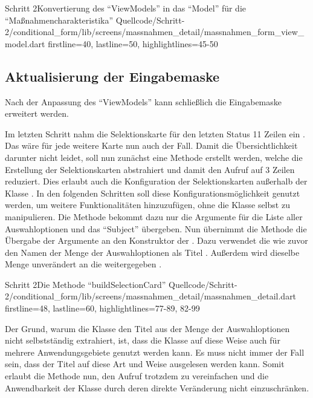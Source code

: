 \begin{alexlisting}{Schritt 2}{Konvertierung des \enquote{ViewModels} in das \enquote{Model} für die \enquote{Maßnahmencharakteristika}}
  {Quellcode/Schritt-2/conditional_form/lib/screens/massnahmen_detail/massnahmen_form_view_model.dart}
  {firstline=40, lastline=50, highlightlines={45-50}}
  \label{lst:Schritt2KonvertierungDesViewModelsInDasModel}
\end{alexlisting}

\subsection{Aktualisierung der Eingabemaske}

Nach der Anpassung des \enquote{ViewModels} kann schließlich die Eingabemaske erweitert werden.

Im letzten Schritt nahm die Selektionskarte für den letzten Status 11 Zeilen ein . 
Das wäre für jede weitere Karte nun auch der Fall.
Damit die Übersichtlichkeit darunter nicht leidet, soll nun zunächst eine Methode erstellt werden, welche die Erstellung der Selektionskarten abstrahiert und damit den Aufruf auf 3 Zeilen reduziert.
Dies erlaubt auch die Konfiguration der Selektionskarten außerhalb der Klasse .
In den folgenden Schritten soll diese Konfigurationsmöglichkeit genutzt werden, um weitere Funktionalitäten hinzuzufügen, ohne die Klasse selbst zu manipulieren.
Die Methode  bekommt dazu nur die Argumente für die Liste aller Auswahloptionen   und das \enquote{Subject}   übergeben.
Nun übernimmt die Methode die Übergabe der Argumente an den Konstruktor der .
Dazu verwendet die  wie zuvor den Namen der Menge der Auswahloptionen als Titel .
Außerdem wird dieselbe Menge unverändert an die  weitergegeben .

\begin{alexlisting}{Schritt 2}{Die Methode \enquote{buildSelectionCard}}
  {Quellcode/Schritt-2/conditional_form/lib/screens/massnahmen_detail/massnahmen_detail.dart}
  {firstline=48, lastline=60, highlightlines={77-89, 82-99}}
  \label{lst:Schritt2MassnahmencharakteristikaSelektionskartenWerdenErgaenzt}
\end{alexlisting}

Der Grund, warum die Klasse  den Titel aus der Menge der Auswahloptionen nicht selbstständig extrahiert, ist, dass die Klasse auf diese Weise auch für mehrere Anwendungsgebiete genutzt werden kann.
Es muss nicht immer der Fall sein, dass der Titel auf diese Art und Weise ausgelesen werden kann.
Somit erlaubt die Methode  nun, den Aufruf trotzdem zu vereinfachen und die Anwendbarkeit der Klasse  durch deren direkte Veränderung nicht einzuschränken.

